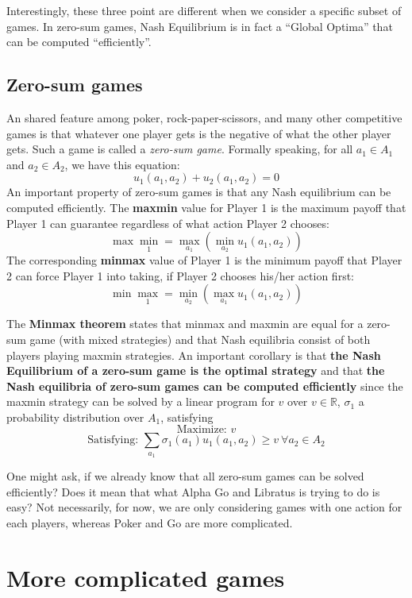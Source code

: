\documentclass[10pt,a4paper]{article}
\newcommand{\bbR}{\mathbb{R}}
\begin{document}
Interestingly, these three point are different when we consider a specific subset of games. In zero-sum games, Nash Equilibrium is in fact a ``Global Optima'' that can be computed ``efficiently''.

\subsection{Zero-sum games}
An shared feature among poker, rock-paper-scissors, and many other competitive games is that whatever one player gets is the negative of what the other player gets. Such a game is called a \textit{zero-sum game}. Formally speaking, for all $a_1 \in A_1$ and $a_2 \in A_2$, we have this equation:
$$
  u_1(a_1, a_2) + u_2(a_1, a_2) = 0
$$
An important property of zero-sum games is that any Nash equilibrium can be computed efficiently. The \textbf{maxmin} value for Player 1 is the maximum payoff that Player 1 can guarantee regardless of what action Player 2 chooses:
$$
  \max\min_1 = \max_{a_1}(\min_{a_{2}} u_1(a_1, a_{2}))
$$
The corresponding \textbf{minmax} value of Player 1 is the minimum payoff that Player 2 can force Player 1 into taking, if Player 2 chooses his/her action first:
$$
  \min\max_1 = \min_{a_2}(\max_{a_{1}} u_1(a_1, a_{2}))
$$

The \textbf{Minmax theorem} states that minmax and maxmin are equal for a zero-sum game (with mixed strategies)  and that Nash equilibria consist of both players playing maxmin strategies. An important corollary is that \textbf{the Nash Equilibrium of a zero-sum game is the optimal strategy} and that \textbf{the Nash equilibria of zero-sum games can be computed efficiently} since the maxmin strategy can be solved by a linear program for $v$ over $v \in \bbR$, $\sigma_1$ a probability distribution over $A_1$, satisfying
$$
\text{Maximize: } v
$$
$$
\text{Satisfying: } \sum_{a_1}\sigma_1(a_1)u_1(a_1, a_2) \geq v\ \forall a_2 \in A_2
$$

One might ask, if we already know that all zero-sum games can be solved efficiently? Does it mean that what Alpha Go and Libratus is trying to do is easy? Not necessarily, for now, we are only considering games with one action for each players, whereas Poker and Go are more complicated.

\newpage
\section{More complicated games}
\end{document}

